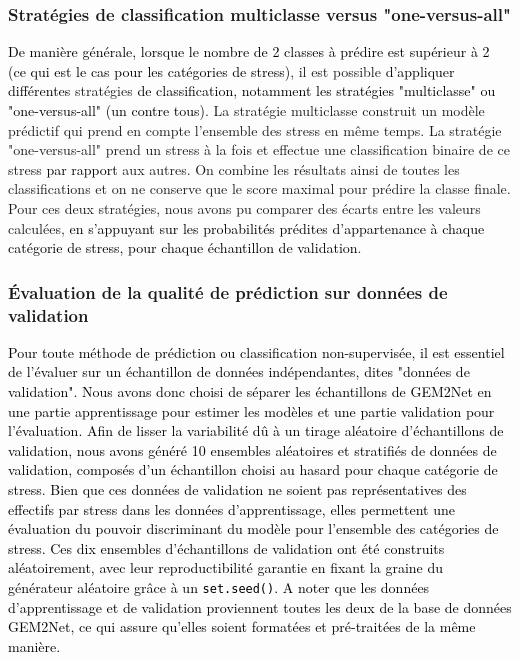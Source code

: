 \documentclass[twoside]{article}
\newcommand{\AR}[1]{\textcolor{black}{#1}}
\begin{document}
    \subsubsection{Stratégies de classification multiclasse versus "one-versus-all"}
    
    \AR{De manière générale, lorsque le nombre de 2 classes à prédire est supérieur à 2 (ce qui est le cas pour les catégories de stress)}, il est possible \AR{d'appliquer différentes} stratégies \AR{de classification, notamment les stratégies "multiclasse" ou "one-versus-all" (un contre tous)}. La stratégie multiclasse construit un modèle prédictif qui prend en compte l'ensemble des stress en même temps. La stratégie "one-versus-all" prend un stress à la fois et effectue une classification binaire de ce stress \AR{par rapport} aux autres. On combine les résultats ainsi de toutes les classifications et on ne conserve que le score maximal pour prédire la classe finale. Pour ces deux stratégies, nous avons pu comparer des écarts entre les valeurs calculées, \AR{en s'appuyant sur les probabilités prédites d'appartenance à chaque catégorie de stress, pour chaque échantillon de validation}.
    
    \subsubsection{Évaluation de la qualité de prédiction sur données de validation}
    
    \AR{Pour toute méthode de prédiction ou classification non-supervisée, il est essentiel de l'évaluer sur un échantillon de données indépendantes, dites "données de validation". Nous avons donc choisi de séparer les échantillons de GEM2Net en une partie apprentissage pour estimer les modèles et une partie validation pour l'évaluation. Afin de lisser la variabilité dû à un tirage aléatoire d'échantillons de validation, nous avons généré 10 ensembles aléatoires et stratifiés de données de validation, composés d'un échantillon choisi au hasard pour chaque catégorie de stress. Bien que ces données de validation ne soient pas représentatives des effectifs par stress dans les données d'apprentissage, elles permettent une évaluation du pouvoir discriminant du modèle pour l'ensemble des catégories de stress. Ces dix ensembles d'échantillons de validation ont été construits aléatoirement, avec leur reproductibilité garantie en fixant la graine du générateur aléatoire grâce à un \texttt{set.seed()}. A noter que les données d'apprentissage et de validation proviennent toutes les deux de la base de données GEM2Net, ce qui assure qu'elles soient formatées et pré-traitées de la même manière.}
    
\end{document}
